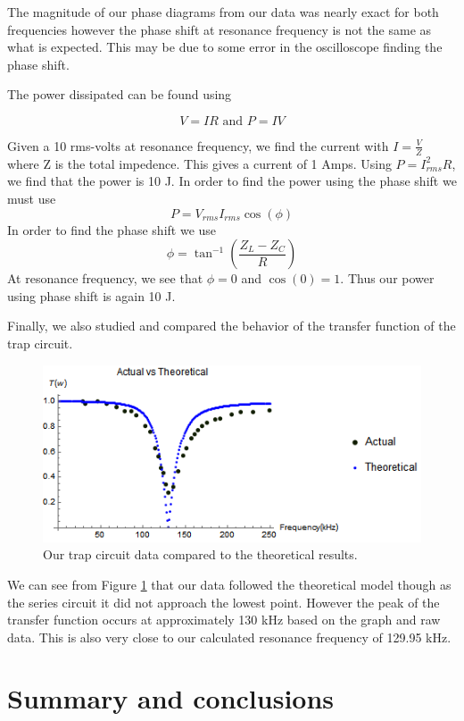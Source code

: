 \documentclass[11pt,letterpaper,onecolumn]{article}
\begin{document}
The magnitude of our phase diagrams from our data was nearly exact for both frequencies however the phase shift at resonance frequency is not the same as what is expected. This may be due to some error in the oscilloscope finding the phase shift.

The power dissipated can be found using 

$$V=IR \text{ and } P = IV$$

Given a 10 rms-volts at resonance frequency, we find the current with $I=\frac{V}{Z}$ where Z is the total impedence. This gives a current of 1 Amps. Using $P=I_{rms}^2R$, we find that the power is 10 J. In order to find the power using the phase shift we must use
$$P = V_{rms}I_{rms}\cos(\phi)$$
In order to find the phase shift we use
$$\phi=\tan^{-1}\left(\frac{Z_L-Z_C}{R}\right)$$
At resonance frequency, we see that $\phi=0$ and $\cos(0) = 1$. Thus our power using phase shift is again 10 J.

Finally, we also studied and compared the behavior of the transfer function of the trap circuit. 

\begin{figure}[H]
    \centering
    \includegraphics[scale = 0.8]{Notch.png}
    \caption{Our trap circuit data compared to the theoretical results.}
    \label{fig:trapmodel}
\end{figure}

We can see from Figure \ref{fig:trapmodel} that our data followed the theoretical model though as the series circuit it did not approach the lowest point. However the peak of the transfer function occurs at approximately 130 kHz based on the graph and raw data. This is also very close to our calculated resonance frequency of 129.95 kHz.

\section{Summary and conclusions}
\end{document}
